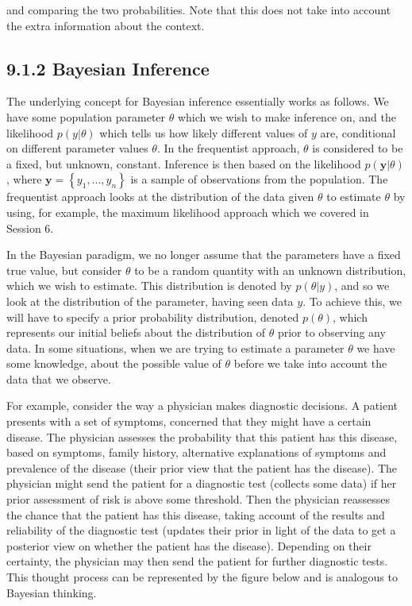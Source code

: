 \documentclass[letterpaper,10pt,english]{jupyterBook}
\begin{document}
\sphinxAtStartPar
and comparing the two probabilities. Note that this does not take into account the extra information about the context.


\subsection{9.1.2 Bayesian Inference}
\label{\detokenize{09.b. Bayesian Statistics I:bayesian-inference}}
\sphinxAtStartPar
The underlying concept for Bayesian inference essentially works as follows. We have some population parameter \(\theta\) which we wish to make inference on, and the likelihood \(p(y|\theta)\) which tells us how likely different values of \(y\) are, conditional on different parameter values \(\theta\). In the frequentist approach, \(\theta\) is considered to be a fixed, but unknown, constant. Inference is then based on the likelihood \(p(\mathbf{y}|\theta)\), where \(\mathbf{y} = \left\{y_1, . . . ,y_n\right\}\) is a sample of observations from the population. The frequentist approach looks at the distribution of the data given \(\theta\) to estimate \(\theta\) by using, for example, the maximum likelihood approach which we covered in Session 6.

\sphinxAtStartPar
In the Bayesian paradigm, we no longer assume that the parameters have a fixed true value, but consider \(\theta\) to be a random quantity with an unknown distribution, which we wish to estimate. This distribution is denoted by \(p(\theta|y)\), and so we look at the distribution of the parameter, having seen data \(y\). To achieve this, we will have to specify a prior probability distribution, denoted \(p(\theta)\), which represents our initial beliefs about the distribution of \(\theta\)
prior to observing any data. In some situations, when we are trying to estimate a parameter \(\theta\) we have some knowledge, about the possible value of \(\theta\) before we take into account the data that we observe.

\sphinxAtStartPar
For example, consider the way a physician makes diagnostic decisions. A patient presents with a set of symptoms, concerned that they might have a certain disease. The physician assesses the probability that this patient has this disease, based on symptoms, family history, alternative explanations of symptoms and prevalence of the disease (their prior view that the patient has the disease). The physician might send the patient for a diagnostic test (collects some data) if her prior assessment of risk is above some threshold. Then the physician re\sphinxhyphen{}assesses the chance that the patient has this disease, taking account of the results and reliability of the diagnostic test (updates their prior in light of the data to get a posterior view on whether the patient has the disease). Depending on their certainty, the physician may then send the patient for further diagnostic tests. This thought process can be represented by the figure below and is analogous to Bayesian thinking.
\end{document}
